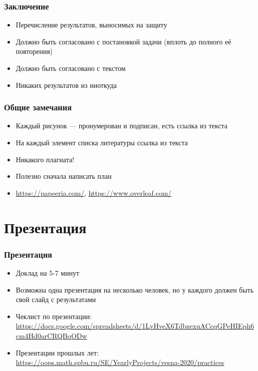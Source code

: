 \documentclass[xetex,mathserif,serif]{beamer}
\begin{document}
    \begin{frame}
        \frametitle{Заключение}
        \begin{itemize}
            \item Перечисление результатов, выносимых на защиту
            \item Должно быть согласовано с постановкой задачи (вплоть до полного её повторения)
            \item Должно быть согласовано с текстом
            \item Никаких результатов из ниоткуда
        \end{itemize}
    \end{frame}

    \begin{frame}
        \frametitle{Общие замечания}
        \begin{itemize}
            \item Каждый рисунок --- пронумерован и подписан, есть ссылка из текста
            \item На каждый элемент списка литературы ссылка из текста
            \item Никакого плагиата!
            \item Полезно сначала написать план
            \item \url{https://papeeria.com/}, \url{https://www.overleaf.com/}
        \end{itemize}
    \end{frame}

    \section{Презентация}

    \begin{frame}
        \frametitle{Презентация}
        \begin{itemize}
            \item Доклад на 5-7 минут
            \item Возможна одна презентация на несколько человек, но у каждого должен быть свой слайд с результатами
            \item Чеклист по презентации: \url{https://docs.google.com/spreadsheets/d/1LvHveX6TdbzexuACcqGPeHIEph6cm4Hd0arCRQBqODw}
            \item Презентации прошлых лет: \url{https://oops.math.spbu.ru/SE/YearlyProjects/vesna-2020/practices}
        \end{itemize}
    \end{frame}
\end{document}
